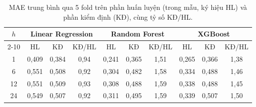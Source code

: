 \begin{table}[htbp]
\centering
\caption[MAE trên phần huấn luyện và phần kiểm định]{MAE trung bình qua 5 fold trên phần huấn luyện (trong mẫu, ký hiệu HL) và phần kiểm định (KĐ), cùng tỷ số KĐ/HL.}
\label{tab:train_val}
\small
\begin{tabular}{|c|c|c|c|c|c|c|c|c|c|}
\hline
\multirow{2}{*}{\textbf{$h$}} & \multicolumn{3}{c|}{\textbf{Linear Regression}} & \multicolumn{3}{c|}{\textbf{Random Forest}} & \multicolumn{3}{c|}{\textbf{XGBoost}} \\
\cline{2-10}
 & HL & KĐ & KĐ/HL & HL & KĐ & KĐ/HL & HL & KĐ & KĐ/HL \\
\hline
1 & 0{,}409 & 0{,}384 & 0{,}94 & 0{,}241 & 0{,}365 & 1{,}51 & 0{,}265 & 0{,}366 & 1{,}38 \\ \hline
6 & 0{,}551 & 0{,}508 & 0{,}92 & 0{,}304 & 0{,}482 & 1{,}58 & 0{,}334 & 0{,}488 & 1{,}46 \\ \hline
12 & 0{,}551 & 0{,}509 & 0{,}93 & 0{,}308 & 0{,}488 & 1{,}59 & 0{,}338 & 0{,}488 & 1{,}45 \\ \hline
24 & 0{,}549 & 0{,}507 & 0{,}92 & 0{,}311 & 0{,}495 & 1{,}59 & 0{,}339 & 0{,}507 & 1{,}50 \\ \hline
\end{tabular}
\end{table}
